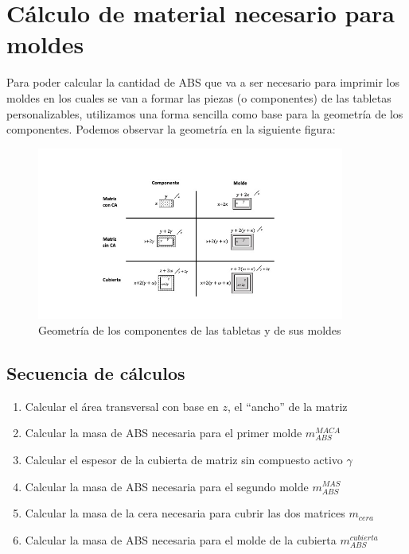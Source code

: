 \documentclass[
]{book}
\providecommand{\tightlist}{%
  \setlength{\itemsep}{0pt}\setlength{\parskip}{0pt}}
\begin{document}
\hypertarget{cuxe1lculo-de-material-necesario-para-moldes}{%
\section{Cálculo de material necesario para moldes}\label{cuxe1lculo-de-material-necesario-para-moldes}}

Para poder calcular la cantidad de ABS que va a ser necesario para imprimir los
moldes en los cuales se van a formar las piezas (o componentes) de las
tabletas personalizables, utilizamos una forma sencilla como base para la
geometría de los componentes. Podemos observar la geometría en la siguiente
figura:

\begin{figure}
\centering
\includegraphics[width=0.9\textwidth,height=\textheight]{Diagramas/geometria_tabletas.jpg}
\caption{Geometría de los componentes de las tabletas y de sus moldes}
\end{figure}

\hypertarget{secuencia-de-cuxe1lculos}{%
\subsection{Secuencia de cálculos}\label{secuencia-de-cuxe1lculos}}

\begin{enumerate}
\def\labelenumi{\arabic{enumi}.}
\tightlist
\item
  Calcular el área transversal con base en \(z\), el ``ancho'' de la matriz
\item
  Calcular la masa de ABS necesaria para el primer molde \(m_{ABS}^{MACA}\)
\item
  Calcular el espesor de la cubierta de matriz sin compuesto activo \(\gamma\)
\item
  Calcular la masa de ABS necesaria para el segundo molde \(m_{ABS}^{MAS}\)
\item
  Calcular la masa de la cera necesaria para cubrir las dos matrices \(m_{cera}\)
\item
  Calcular la masa de ABS necesaria para el molde de la cubierta
  \(m_{ABS}^{cubierta}\)
\end{enumerate}
\end{document}
